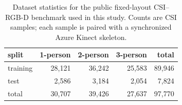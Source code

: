 \begin{table}[htbp]
\caption{Dataset statistics for the public fixed-layout CSI--RGB-D benchmark
used in this study. Counts are CSI samples; each sample is paired
with a synchronized Azure Kinect skeleton.}
\label{tab:dataset-stats}
\centering
\begin{tabular}{l r r r r}
\toprule
split & 1-person & 2-person & 3-person & total \\
\midrule
training & 28{,}121 & 36{,}242 & 25{,}583 & 89{,}946 \\
test     & 2{,}586  & 3{,}184  & 2{,}054  & 7{,}824  \\
\midrule
total    & 30{,}707 & 39{,}426 & 27{,}637 & 97{,}770 \\
\bottomrule
\end{tabular}
\end{table}
